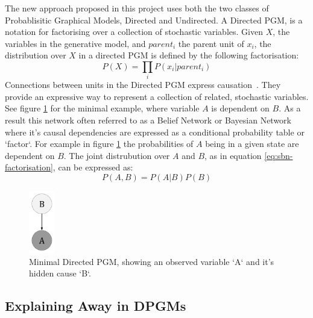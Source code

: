 The new approach proposed in this project uses both the two classes of Probablisitic Graphical Models, Directed and Undirected. A Directed PGM, is a notation for factorising over a collection of stochastic variables.
Given $X$, the variables in the generative model, and $parent_i$ the parent unit of $x_i$, the distribution over $X$ in a directed PGM is defined by the following factorisation:
\begin{equation}\label{eq:sbn-factorisation}
P(X) = \prod_i P(x_i | parent_i)
\end{equation}
Connections between units in the Directed PGM express causation~\cite{pearl2014probabilistic}. They provide an expressive way to represent a collection of related, stochastic variables. See figure \ref{F:PGM-example} for the minimal example, where variable $A$ is dependent on $B$. As a result this network often referred to as a Belief Network or Bayesian Network where it's causal dependencies are expressed as a conditional probability table or `factor`. For example in figure \ref{F:PGM-example} the probabilities of $A$ being in a given state are dependent on $B$. The joint distrubution over $A$ and $B$, as in equation \ref{eq:sbn-factorisation}, can be expressed as:
$$P(A,B) = P(A|B)P(B)$$
\begin{figure}
\begin{center}
  \includegraphics[width = 0.1\textwidth]{Assets/PGM_Example_1.png}
\caption{Minimal Directed PGM, showing an observed variable `A` and it's hidden cause `B`.}
\label{F:PGM-example}
\end{center}
\end{figure}


\subsection{Explaining Away in DPGMs}

